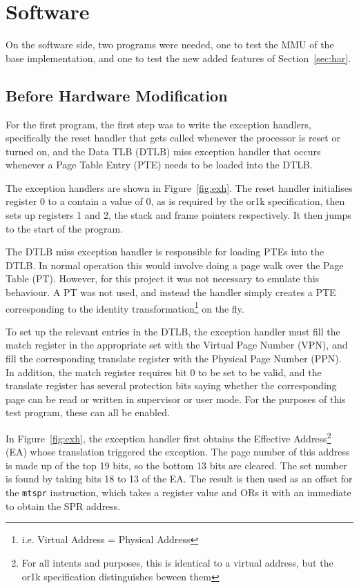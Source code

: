 \section{Software}
On the software side, two programs were needed, one to test the MMU of the base implementation, and one to test the new added features of Section~\ref{sec:har}.

\subsection{Before Hardware Modification}
For the first program, the first step was to write the exception handlers, specifically the reset handler that gets called whenever the processor is reset or turned on, and the Data TLB (DTLB) miss exception handler that occurs whenever a Page Table Entry (PTE) needs to be loaded into the DTLB.

The exception handlers are shown in Figure~\ref{fig:exh}. The reset handler initialises register 0 to a contain a value of 0, as is required by the or1k specification, then sets up registers 1 and 2, the stack and frame pointers respectively. It then jumps to the start of the program.

The DTLB miss exception handler is responsible for loading PTEs into the DTLB. In normal operation this would involve doing a page walk over the Page Table (PT). However, for this project it was not necessary to emulate this behaviour. A PT was not used, and instead the handler simply creates a PTE corresponding to the identity transformation\footnote{i.e. Virtual Address = Physical Address} on the fly.

To set up the relevant entries in the DTLB, the exception handler must fill the match register in the appropriate set with the Virtual Page Number (VPN), and fill the corresponding translate register with the Physical Page Number (PPN). In addition, the match register requires bit 0 to be set to be valid, and the translate register has several protection bits saying whether the corresponding page can be read or written in supervisor or user mode. For the purposes of this test program, these can all be enabled.

In Figure~\ref{fig:exh}, the exception handler first obtains the Effective Address\footnote{For all intents and purposes, this is identical to a virtual address, but the or1k specification distinguishes beween them} (EA) whose translation triggered the exception. The page number of this address is made up of the top 19 bits, so the bottom 13 bits are cleared. The set number is found by taking bits 18 to 13 of the EA. The result is then used as an offset for the \texttt{mtspr} instruction, which takes a register value and ORs it with an immediate to obtain the SPR address.

